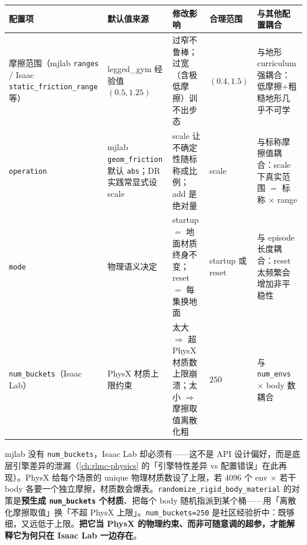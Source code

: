 \begin{center}
\small
\begin{tabular}{@{}lp{2.6cm}p{3.0cm}p{2.4cm}p{2.6cm}@{}}
\toprule
配置项 & 默认值来源 & 修改影响 & 合理范围 & 与其他配置耦合 \\
\midrule
摩擦范围（mjlab \verb|ranges| / Isaac \verb|static_friction_range| 等） & legged\_gym 经验值 $(0.5,1.25)$ & 过窄不鲁棒；过宽（含极低摩擦）训不出步态 & $(0.4,1.5)$ & 与地形 curriculum 强耦合：低摩擦$+$粗糙地形几乎不可学 \\
\verb|operation| & mjlab \verb|geom_friction| 默认 \verb|abs|；DR 实践常显式设 scale & scale 让不确定性随标称成比例；add 是绝对量 & scale & 与标称摩擦值耦合：scale 下真实范围 $=$ 标称 $\times$ range \\
\verb|mode| & 物理语义决定 & startup $=$ 地面材质终身不变；reset $=$ 每集换地面 & startup 或 reset & 与 episode 长度耦合：reset 太频繁会增加非平稳性 \\
\verb|num_buckets|（Isaac Lab） & PhysX 材质上限约束 & 太大 $\Rightarrow$ 超 PhysX 材质数上限崩溃；太小 $\Rightarrow$ 摩擦取值离散化粗 & $250$ & 与 \verb|num_envs| $\times$ body 数耦合 \\
\bottomrule
\end{tabular}
\end{center}

\begin{insight}\label{ins:rlmc-dr-buckets}
mjlab 没有 \verb|num_buckets|，Isaac Lab 却必须有——这不是 API 设计偏好，而是底层引擎差异的泄漏（\cref{ch:rlmc-physics} 的「引擎特性差异 vs 配置错误」在此再现）。PhysX 给每个场景的 unique 物理材质数设了上限，若 $4096$ 个 env $\times$ 若干 body 各要一个独立摩擦，材质数会爆表。\verb|randomize_rigid_body_material| 的对策是\textbf{预生成 \texttt{num\_buckets} 个材质}、把每个 body 随机指派到某个桶——用「离散化摩擦取值」换「不超 PhysX 上限」。\verb|num_buckets=250| 是社区经验折中：既够细，又远低于上限。\textbf{把它当 PhysX 的物理约束、而非可随意调的超参，才能解释它为何只在 Isaac Lab 一边存在}。
\end{insight}

